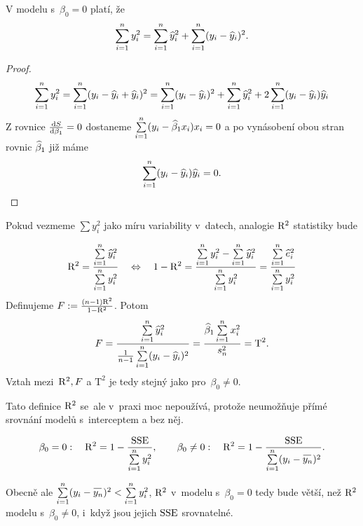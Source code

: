 \begin{theorem}
V modelu s~$\beta_0 = 0$ platí, že
 $$
 \sum\limits_{i=1}^{n} y_i^2 = \sum\limits_{i=1}^{n} \widehat{y}_i^2 + \sum\limits_{i=1}^{n} (y_i - \widehat{y}_i)^2.
 $$
\end{theorem}

\begin{proof}
 $$
 \sum\limits_{i=1}^{n} y_i^2 = \sum\limits_{i=1}^{n} (y_i - \widehat{y}_i + \widehat{y}_i)^2 = \sum\limits_{i=1}^{n} (y_i - \widehat{y}_i)^2 + \sum\limits_{i=1}^{n} \widehat{y}_i^2 + 2 \sum\limits_{i=1}^{n} (y_i - \widehat{y}_i) \widehat{y}_i
 $$
 Z rovnice $\frac{\mathrm{d} S}{\mathrm{d} \beta_1} = 0$ dostaneme $\sum\limits_{i=1}^{n} (y_i - \widehat{\beta}_1 x_i) x_i = 0
 $ a po vynásobení obou stran rovnic $\widehat{\beta}_1$ již máme
 $$
 \sum\limits_{i=1}^{n} (y_i - \widehat{y}_i) \widehat{y}_i = 0.
 $$
\end{proof}
Pokud vezmeme $\sum y_i^2$ jako míru variability v~datech, analogie $\mathrm{R}^2$ statistiky bude

 $$
  \mathrm{R}^2 = \frac{\sum\limits_{i=1}^{n} \widehat{y}_i^2}{\sum\limits_{i=1}^{n} y_i^2} \quad \Leftrightarrow \quad
  1 - \mathrm{R}^2 = \frac{\sum\limits_{i=1}^{n} y_i^2 - \sum\limits_{i=1}^{n} \widehat{y}_i^2}{\sum\limits_{i=1}^{n} y_i^2} = \frac{\sum\limits_{i=1}^{n} \widehat{e}_i^2}{\sum\limits_{i=1}^{n} y_i^2 }
 $$
Definujeme $F : = \frac{(n-1) \mathrm{R}^2}{1 - \mathrm{R}^2}$. Potom
 $$
  F = \frac{\sum\limits_{i=1}^{n} \widehat{y}_i^2 }{\frac{1}{n-1} \sum\limits_{i=1}^{n} (y_i - \widehat{y}_i)^2 } = \frac{\widehat{\beta}_1 \sum\limits_{i=1}^{n} x_i^2 }{ s_n^2} = \text{T}^2.
 $$
Vztah mezi~$\mathrm{R}^2, F$ a $\mathrm{T}^2$ je tedy stejný jako pro~$\beta_0 \neq 0$.

\begin{remark}
  Tato definice $\mathrm{R}^2$ se~ale v~praxi moc nepoužívá, protože neumožňuje přímé srovnání modelů s~interceptem a bez něj.
\end{remark}
 $$
  \beta_0 = 0  : \quad \RMR^2 = 1 - \frac{\SSE}{\sumin y_i^2},
\qquad
  \beta_0 \neq 0  : \quad \RMR^2 = 1 - \frac{\SSE}{\sumin (y_i - \oynn)^2}.
 $$

Obecně ale $\sumin (y_i - \oynn)^2 < \sumin y_i^2$, $\mathrm{R}^2$ v~modelu s~$\beta_0 = 0$ tedy bude větší, než $\mathrm{R}^2$ modelu s~$\beta_0 \neq 0$, i~když jsou jejich $\mathrm{SSE}$ srovnatelné.

